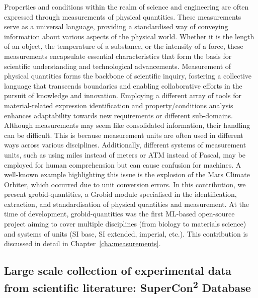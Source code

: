 Properties and conditions within the realm of science and engineering are often expressed through measurements of physical quantities. These measurements serve as a universal language, providing a standardised way of conveying information about various aspects of the physical world. Whether it is the length of an object, the temperature of a substance, or the intensity of a force, these measurements encapsulate essential characteristics that form the basis for scientific understanding and technological advancements.
Measurement of physical quantities forms the backbone of scientific inquiry, fostering a collective language that transcends boundaries and enabling collaborative efforts in the pursuit of knowledge and innovation.
Employing a different array of tools for material-related expression identification and property/conditions analysis enhances adaptability towards new requirements or different sub-domains.
Although measurements may seem like consolidated information, their handling can be difficult. This is because measurement units are often used in different ways across various disciplines. Additionally, different systems of measurement units, such as using miles instead of meters or ATM instead of Pascal, may be employed for human comprehension but can cause confusion for machines. A well-known example highlighting this issue is the explosion of the Mars Climate Orbiter, which occurred due to unit conversion errors.
In this contribution, we present grobid-quantities, a Grobid module specialised in the identification, extraction, and standardisation of physical quantities and measurement. At the time of development, grobid-quantities was the first ML-based open-source project aiming to cover multiple disciplines (from biology to materials science) and systems of units (SI base, SI extended, imperial, etc.). 
This contribution is discussed in detail in Chapter~\ref{cha:measurements}.


\subsection{Large scale collection of experimental data from scientific literature: SuperCon\texorpdfstring{\textsuperscript{2}}{2} Database}
\label{sec:intro-supercon2}

